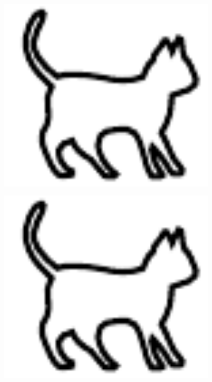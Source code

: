 \documentclass{cumcmthesis} %
\begin{document}
\begin{figure}[H]
    \centering
    \begin{minipage}[c]{0.3\textwidth}
        \centering
        \includegraphics[width=0.95\textwidth]{img/cat.pdf}
        \label{fig:sample-figure-a}
    \end{minipage}
    \begin{minipage}[c]{0.3\textwidth}
        \centering
        \includegraphics[width=0.95\textwidth]{img/cat.pdf}

\end{minipage}
\end{figure}
\end{document}
